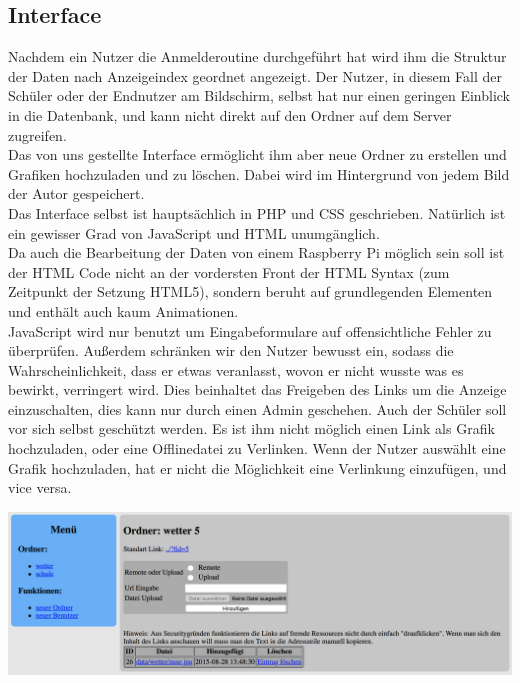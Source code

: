\subsection{Interface} %
Nachdem ein Nutzer die Anmelderoutine durchgeführt hat wird ihm die Struktur der Daten nach Anzeigeindex geordnet angezeigt.
Der Nutzer, in diesem Fall der Schüler oder der Endnutzer am Bildschirm,
selbst hat nur einen geringen Einblick in die Datenbank, und kann nicht direkt auf den Ordner auf dem Server zugreifen.\\
Das von uns gestellte Interface ermöglicht ihm aber neue Ordner zu erstellen und Grafiken hochzuladen und zu löschen.
Dabei wird im Hintergrund von jedem Bild der Autor gespeichert. \\
Das Interface selbst ist hauptsächlich in PHP und CSS geschrieben.
Natürlich ist ein gewisser Grad von JavaScript und HTML unumgänglich. \\
Da auch die Bearbeitung der Daten von einem Raspberry Pi möglich sein soll ist der HTML Code nicht an der vordersten Front der HTML Syntax (zum Zeitpunkt der Setzung HTML5),
sondern beruht auf grundlegenden Elementen und enthält auch kaum Animationen. \\
JavaScript wird nur benutzt um Eingabeformulare auf offensichtliche Fehler zu überprüfen.
Außerdem schränken wir den Nutzer bewusst ein, sodass die Wahrscheinlichkeit,
dass er etwas veranlasst, wovon er nicht wusste was es bewirkt, verringert wird.
Dies beinhaltet das Freigeben des Links um die Anzeige einzuschalten,
dies kann nur durch einen Admin geschehen.
Auch der Schüler soll vor sich selbst geschützt werden.
Es ist ihm nicht möglich einen Link als Grafik hochzuladen,
oder eine Offlinedatei zu Verlinken.
Wenn der Nutzer auswählt eine Grafik hochzuladen,
hat er nicht die Möglichkeit eine Verlinkung einzufügen, und vice versa.
\begin{center}
\includegraphics[width=\linewidth]{imgs/wms/wms_interface.png}
\end{center}

